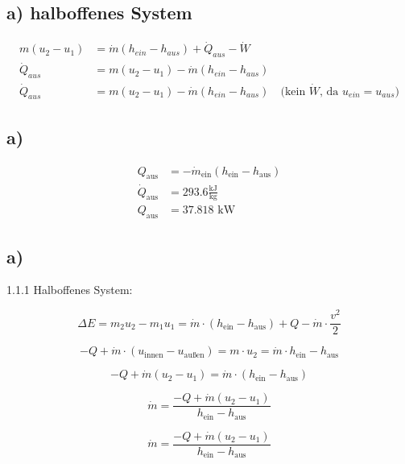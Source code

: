 \subsection*{a) halboffenes System}

\begin{align*}
    m(u_2 - u_1) &= \dot{m} (h_{ein} - h_{aus}) + \dot{Q}_{aus} - \dot{W} \\
    \dot{Q}_{aus} &= m(u_2 - u_1) - \dot{m} (h_{ein} - h_{aus}) \\
    \dot{Q}_{aus} &= m(u_2 - u_1) - \dot{m} (h_{ein} - h_{aus}) \quad \text{(kein $\dot{W}$, da $u_{ein} = u_{aus}$)}
\end{align*}



\subsection*{a)}
\begin{align*}
    Q_{\text{aus}} &= -\dot{m}_{\text{ein}} (h_{\text{ein}} - h_{\text{aus}}) \\
    \dot{Q}_{\text{aus}} &= 293.6 \frac{\text{kJ}}{\text{kg}} \\
    Q_{\text{aus}} &= 37.818 \text{ kW}
\end{align*}



\subsection*{a)}
1.1.1 Halboffenes System:

\[
\Delta E = m_2 u_2 - m_1 u_1 = \dot{m} \cdot (h_{\text{ein}} - h_{\text{aus}}) + Q - \dot{m} \cdot \frac{v^2}{2}
\]

\[
-Q + \dot{m} \cdot (u_{\text{innen}} - u_{\text{außen}}) = m \cdot u_2 = \dot{m} \cdot h_{\text{ein}} - h_{\text{aus}}
\]

\[
-Q + \dot{m} (u_2 - u_1) = \dot{m} \cdot (h_{\text{ein}} - h_{\text{aus}})
\]

\[
\dot{m} = \frac{-Q + \dot{m} (u_2 - u_1)}{h_{\text{ein}} - h_{\text{aus}}}
\]

\[
\dot{m} = \frac{-Q + \dot{m} (u_2 - u_1)}{h_{\text{ein}} - h_{\text{aus}}}
\]